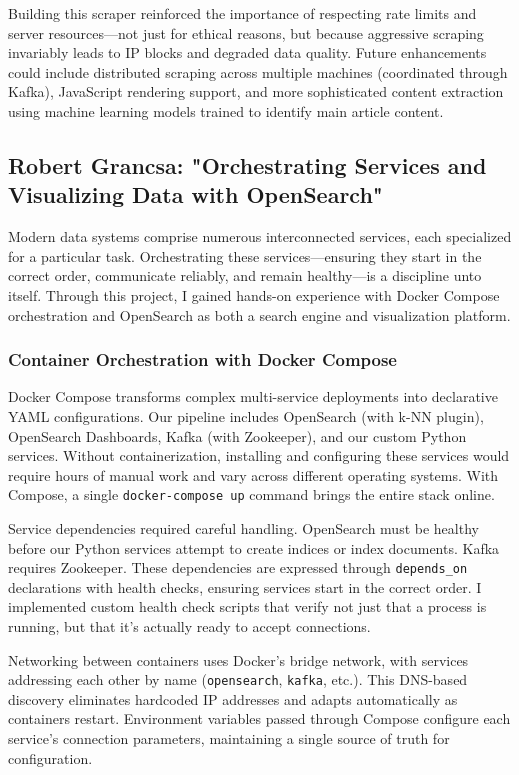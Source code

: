 \documentclass[12pt, a4paper]{article}
\begin{document}
Building this scraper reinforced the importance of respecting rate limits and server resources—not just for ethical reasons, but because aggressive scraping invariably leads to IP blocks and degraded data quality. Future enhancements could include distributed scraping across multiple machines (coordinated through Kafka), JavaScript rendering support, and more sophisticated content extraction using machine learning models trained to identify main article content.

\newpage
\subsection{Robert Grancsa: "Orchestrating Services and Visualizing Data with OpenSearch"}

Modern data systems comprise numerous interconnected services, each specialized for a particular task. Orchestrating these services—ensuring they start in the correct order, communicate reliably, and remain healthy—is a discipline unto itself. Through this project, I gained hands-on experience with Docker Compose orchestration and OpenSearch as both a search engine and visualization platform.

\subsubsection*{Container Orchestration with Docker Compose}

Docker Compose transforms complex multi-service deployments into declarative YAML configurations. Our pipeline includes OpenSearch (with k-NN plugin), OpenSearch Dashboards, Kafka (with Zookeeper), and our custom Python services. Without containerization, installing and configuring these services would require hours of manual work and vary across different operating systems. With Compose, a single \texttt{docker-compose up} command brings the entire stack online.

Service dependencies required careful handling. OpenSearch must be healthy before our Python services attempt to create indices or index documents. Kafka requires Zookeeper. These dependencies are expressed through \texttt{depends\_on} declarations with health checks, ensuring services start in the correct order. I implemented custom health check scripts that verify not just that a process is running, but that it's actually ready to accept connections.

Networking between containers uses Docker's bridge network, with services addressing each other by name (\texttt{opensearch}, \texttt{kafka}, etc.). This DNS-based discovery eliminates hardcoded IP addresses and adapts automatically as containers restart. Environment variables passed through Compose configure each service's connection parameters, maintaining a single source of truth for configuration.
\end{document}
